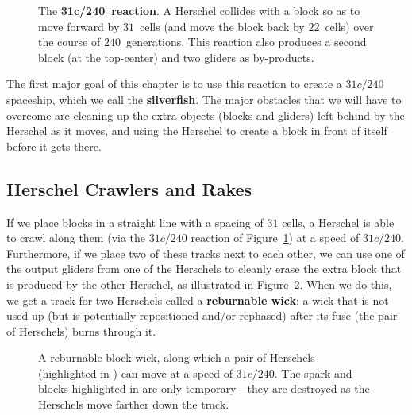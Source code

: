 \begin{figure}[!htb]
	\centering{}
	\caption{The \textbf{31c/240~reaction}. A Herschel collides with a block so as to move forward by $31$~cells (and move the block back by $22$~cells) over the course of $240$~generations. This reaction also produces a second block (at the top-center) and two gliders as by-products.}\label{fig:31c_240_reaction}
\end{figure}

The first major goal of this chapter is to use this reaction to create a $31c/240$ spaceship, which we call the \textbf{silverfish}. The major obstacles that we will have to overcome are cleaning up the extra objects (blocks and gliders) left behind by the Herschel as it moves, and using the Herschel to create a block in front of itself before it gets there.


\subsection{Herschel Crawlers and Rakes}\label{sec:silverfish_herschel_crawler}

If we place blocks in a straight line with a spacing of $31$ cells, a Herschel is able to crawl along them (via the $31c/240$ reaction of Figure~\ref{fig:31c_240_reaction}) at a speed of $31c/240$. Furthermore, if we place two of these tracks next to each other, we can use one of the output gliders from one of the Herschels to cleanly erase the extra block that is produced by the other Herschel, as illustrated in Figure~\ref{fig:31c_240_herschel_pair}. When we do this, we get a track for two Herschels called a \textbf{reburnable wick}: a wick that is not used up (but is potentially repositioned and/or rephased) after its fuse (the pair of Herschels) burns through it.

\begin{figure}[!htb]
	\centering
	\caption{A reburnable block wick, along which a pair of Herschels (highlighted in ) can move at a speed of $31c/240$. The spark and blocks highlighted in  are only temporary---they are destroyed as the Herschels move farther down the track.}\label{fig:31c_240_herschel_pair}
\end{figure}

